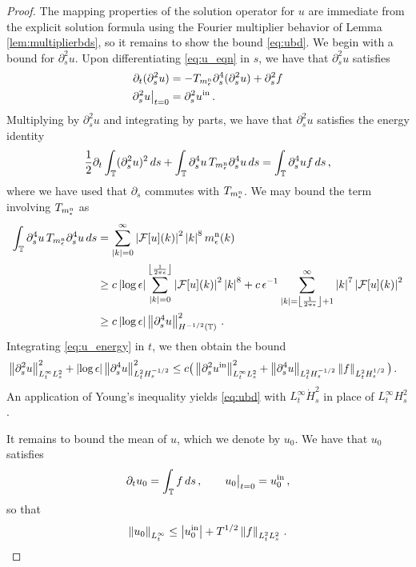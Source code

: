 \documentclass[11pt,reqno]{amsart}
\newcommand{\T}{\mathbb{T}}
\newcommand{\p}{\partial}
\newcommand{\abs}[1]{\left\lvert #1 \right\rvert}
\newcommand{\norm}[1]{\left\lVert #1 \right\rVert}
\newcommand{\floor}[1]{\left\lfloor #1 \right\rfloor}
\newcommand{\mc}[1]{\mathcal{#1}}
\numberwithin{equation}{section}
\theoremstyle{definition}
\begin{document}
\begin{proof}
The mapping properties of the solution operator for $u$ are immediate from the explicit solution formula using the Fourier multiplier behavior of Lemma \ref{lem:multiplierbds}, so it remains to show the bound \eqref{eq:ubd}.
We begin with a bound for $\p_s^2u$. Upon differentiating \eqref{eq:u_eqn} in $s$, we have that $\p_s^2u$ satisfies
\begin{equation}
\begin{aligned}
  \p_t (\p_s^2u) &= -T_{m_\epsilon^{\rm n}}\p_s^4(\p_s^2u) + \p_s^2f \\
  \p_s^2u\big|_{t=0} &= \p_s^2u^{\rm in}\,.
\end{aligned}
\end{equation}
%
Multiplying by $\p_s^2u$ and integrating by parts, we have that $\p_s^2u$ satisfies the energy identity
\begin{equation}\label{eq:u_energy}
   \frac{1}{2}\p_t\int_\T (\p_s^2u)^2\,ds+\int_\T\p_s^4u\,T_{m_\epsilon^{\rm n}}\p_s^4u\,ds = \int_\T \p_s^4uf\,ds\,,
\end{equation}
where we have used that $\p_s$ commutes with $T_{m_\epsilon^{\rm n}}$. We may bound the term involving $T_{m_\epsilon^{\rm n}}$ as 
\begin{equation}
\begin{aligned}
  \int_\T\p_s^4u\,T_{m_\epsilon^{\rm n}}\p_s^4u\,ds &= 
  \sum_{\abs{k}=0}^\infty \abs{\mc{F}[u](k)}^2\abs{k}^8m_\epsilon^{\rm n}(k) \\
  &\ge c\abs{\log\epsilon}\sum_{\abs{k}=0}^{\floor{\frac{1}{2\pi\epsilon}}} \abs{\mc{F}[u](k)}^2\abs{k}^8 + c\,\epsilon^{-1}\sum_{\abs{k}=\floor{\frac{1}{2\pi\epsilon}}+1}^{\infty} \abs{k}^7\abs{\mc{F}[u](k)}^2 \\
  &\ge c\abs{\log\epsilon}\norm{\p_s^4u}_{H^{-1/2}(\T)}^2\,.
\end{aligned}
\end{equation}
%
%
Integrating \eqref{eq:u_energy} in $t$, we then obtain the bound
\begin{equation}
\begin{aligned}
   &\norm{\p_s^2u}_{L^\infty_tL^2_s}^2+ \abs{\log\epsilon}\norm{\p_s^4u}_{L^2_tH^{-1/2}_s}^2
   \le c\big(\norm{\p_s^2u^{\rm in}}_{L^\infty_tL^2_s}^2 +\norm{\p_s^4u}_{L^2_tH^{-1/2}_s}\norm{f}_{L^2_tH^{1/2}_s} \big)\,.
\end{aligned}
\end{equation}
An application of Young's inequality yields \eqref{eq:ubd} with $L^\infty_t\dot H^2_s$ in place of $L^\infty_tH^2_s$.


It remains to bound the mean of $u$, which we denote by $u_0$. We have that $u_0$ satisfies
\begin{equation}
  \p_tu_0 = \int_\T f\,ds\,, \qquad u_0\big|_{t=0}=u_0^{\rm in}\,,
\end{equation}
so that
\begin{equation}
  \norm{u_0}_{L^\infty_t} \le \abs{u_0^{\rm in}} + T^{1/2}\norm{f}_{L^2_tL^2_s}\,.
\end{equation}
%
%
\end{proof}
\end{document}
